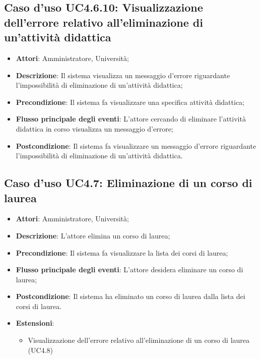 \subsection{Caso d'uso \texorpdfstring{UC4.6.10}{UC4.6.10}: Visualizzazione dell'errore relativo all'eliminazione di un'attività didattica}
\begin{itemize}
\item \textbf{Attori}: Amministratore, Università;
\item \textbf{Descrizione}: Il sistema visualizza un messaggio d'errore riguardante l'impossibilità di eliminazione di un'attività didattica;

\item \textbf{Precondizione}: Il sistema fa visualizzare una specifica attività didattica;

\item \textbf{Flusso principale degli eventi}: L'attore cercando di eliminare l'attività didattica in corso visualizza un messaggio d'errore;

\item \textbf{Postcondizione}: Il sistema fa visualizzare un messaggio d'errore riguardante l'impossibilità di eliminazione di un'attività didattica.

\end{itemize}
\subsection{Caso d'uso \texorpdfstring{UC4.7}{UC4.7}: Eliminazione di un corso di laurea}
\begin{itemize}
\item \textbf{Attori}: Amministratore, Università;
\item \textbf{Descrizione}: L'attore elimina un corso di laurea;

\item \textbf{Precondizione}: Il sistema fa visualizzare la lista dei corsi di laurea;


\item \textbf{Flusso principale degli eventi}: L'attore desidera eliminare un corso di laurea;

\item \textbf{Postcondizione}: Il sistema ha eliminato un corso di laurea dalla lista dei corsi di laurea.


\item \textbf{Estensioni}:
\begin{itemize}
\item Visualizzazione dell'errore relativo all'eliminazione di un corso di laurea (UC4.8)
\end{itemize}
\end{itemize}
